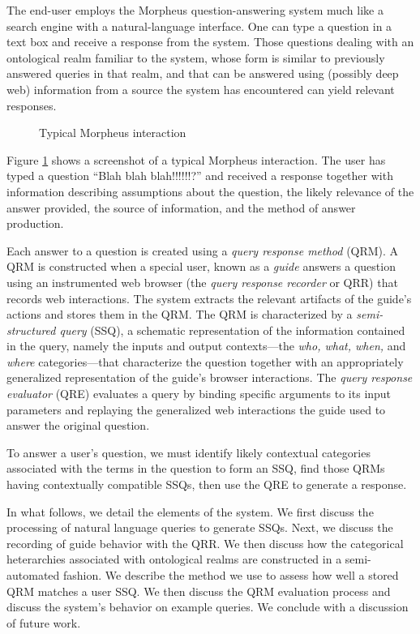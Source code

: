 The end-user employs the Morpheus question-answering system much like a
search engine with a natural-language interface. One can type a question
in a text box and receive a response from the system. Those questions
dealing with an ontological realm familiar to the system, whose form is
similar to previously answered queries in that realm, and that can be
answered using (possibly deep web) information from a source the system
has encountered can yield relevant responses.

\begin{figure}
\caption{Typical Morpheus interaction}
\label{fig:screenshot}
\end{figure}

Figure \ref{fig:screenshot} shows a screenshot of a typical Morpheus
interaction. The user has typed a question ``Blah blah blah!!!!!!?'' and
received a response together with information describing assumptions
about the question, the likely relevance of the answer provided,
the source of information, and the method of answer production.

Each answer to a question is created using a {\it query response
  method} (QRM). A QRM is constructed when a special user, known as a
{\it guide} answers a question using an instrumented web browser (the
{\it query response recorder} or QRR) that records web
interactions. The system extracts the relevant artifacts of the
guide's actions and stores them in the QRM. The QRM is characterized
by a {\it semi-structured query} (SSQ), a schematic representation of
the information contained in the query, namely the inputs and output
contexts---the {\it who, what, when,} and {\it where}
categories---that characterize the question together with an
appropriately generalized representation of the guide's browser
interactions.  The {\it query response evaluator} (QRE) evaluates a
query by binding specific arguments to its input parameters and
replaying the generalized web interactions the guide used to answer
the original question.

To answer a user's question, we must identify likely contextual
categories associated with the terms in the question to form an SSQ,
find those QRMs having contextually compatible SSQs, then use the QRE to
generate a response.


In what follows, we detail the elements of the system.  We first
discuss the processing of natural language queries to generate SSQs.
Next, we discuss the recording of guide behavior with the QRR.  We
then discuss how the categorical heterarchies associated with
ontological realms are constructed in a semi-automated fashion.  We
describe the method we use to assess how well a stored QRM matches a
user SSQ.  We then discuss the QRM evaluation process and discuss the
system's behavior on example queries. We conclude with a discussion of
future work.
 
